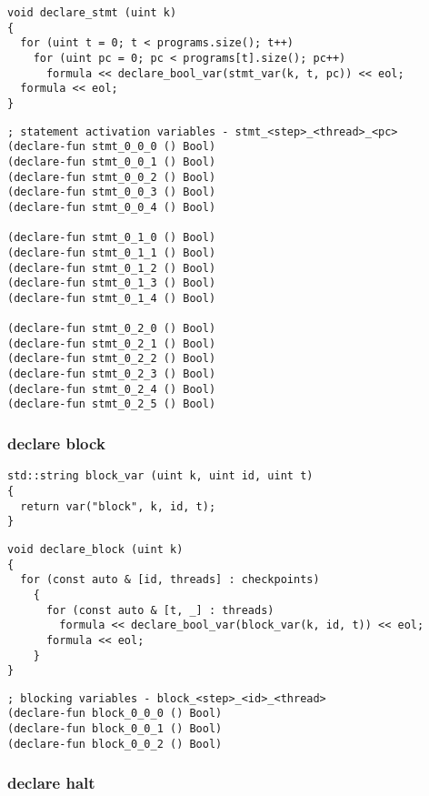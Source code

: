 \begin{lstlisting}[style=c++]
void declare_stmt (uint k)
{
  for (uint t = 0; t < programs.size(); t++)
    for (uint pc = 0; pc < programs[t].size(); pc++)
      formula << declare_bool_var(stmt_var(k, t, pc)) << eol;
  formula << eol;
}
\end{lstlisting}

\begin{lstlisting}[language=SMTLib]
; statement activation variables - stmt_<step>_<thread>_<pc>
(declare-fun stmt_0_0_0 () Bool)
(declare-fun stmt_0_0_1 () Bool)
(declare-fun stmt_0_0_2 () Bool)
(declare-fun stmt_0_0_3 () Bool)
(declare-fun stmt_0_0_4 () Bool)

(declare-fun stmt_0_1_0 () Bool)
(declare-fun stmt_0_1_1 () Bool)
(declare-fun stmt_0_1_2 () Bool)
(declare-fun stmt_0_1_3 () Bool)
(declare-fun stmt_0_1_4 () Bool)

(declare-fun stmt_0_2_0 () Bool)
(declare-fun stmt_0_2_1 () Bool)
(declare-fun stmt_0_2_2 () Bool)
(declare-fun stmt_0_2_3 () Bool)
(declare-fun stmt_0_2_4 () Bool)
(declare-fun stmt_0_2_5 () Bool)
\end{lstlisting}

\subsubsection{declare block}

\begin{lstlisting}[style=c++]
std::string block_var (uint k, uint id, uint t)
{
  return var("block", k, id, t);
}
\end{lstlisting}

\begin{lstlisting}[style=c++]
void declare_block (uint k)
{
  for (const auto & [id, threads] : checkpoints)
    {
      for (const auto & [t, _] : threads)
        formula << declare_bool_var(block_var(k, id, t)) << eol;
      formula << eol;
    }
}
\end{lstlisting}

\begin{lstlisting}[language=SMTLib]
; blocking variables - block_<step>_<id>_<thread>
(declare-fun block_0_0_0 () Bool)
(declare-fun block_0_0_1 () Bool)
(declare-fun block_0_0_2 () Bool)
\end{lstlisting}

\subsubsection{declare halt}

